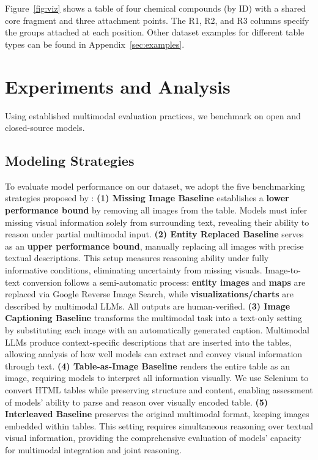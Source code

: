 \documentclass[11pt]{article}
\begin{document}
Figure~\ref{fig:viz} shows a table of four chemical compounds (by ID) with a shared core fragment and three attachment points. The R1, R2, and R3 columns specify the groups attached at each position. Other dataset examples for different table types can be found in Appendix~\ref{sec:examples}.

\vspace{-0.5em}




\section{Experiments and Analysis}\label{sec:experiments}

\vspace{-0.5em}


Using established multimodal evaluation practices, we benchmark on open and closed-source models.

\vspace{-0.5em}

\subsection{Modeling Strategies}
To evaluate model performance on our dataset, we adopt the five benchmarking strategies proposed by \cite{mathur-etal-2024-knowledge}: \textbf{(1) Missing Image Baseline} establishes a \textbf{lower performance bound} by removing all images from the table. Models must infer missing visual information solely from surrounding text, revealing their ability to reason under partial multimodal input. \textbf{(2) Entity Replaced Baseline} serves as an \textbf{upper performance bound}, manually replacing all images with precise textual descriptions. This setup measures reasoning ability under fully informative conditions, eliminating uncertainty from missing visuals. Image-to-text conversion follows a semi-automatic process: \textbf{entity images} and \textbf{maps} are replaced via Google Reverse Image Search, while \textbf{visualizations/charts} are described by multimodal LLMs. All outputs are human-verified. \textbf{(3) Image Captioning Baseline} transforms the multimodal task into a text-only setting by substituting each image with an automatically generated caption. Multimodal LLMs produce context-specific descriptions that are inserted into the tables, allowing analysis of how well models can extract and convey visual information through text. \textbf{(4) Table-as-Image Baseline} renders the entire table as an image, requiring models to interpret all information visually. We use Selenium to convert HTML tables while preserving structure and content, enabling assessment of models’ ability to parse and reason over visually encoded table. \textbf{(5) Interleaved Baseline} preserves the original multimodal format, keeping images embedded within tables. This setting requires simultaneous reasoning over textual visual information, providing the comprehensive evaluation of models’ capacity for multimodal integration and joint reasoning.
\end{document}
